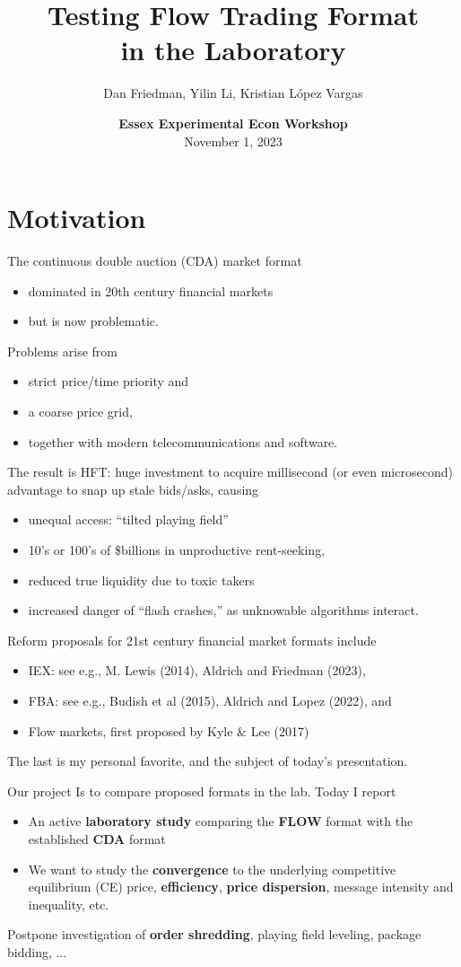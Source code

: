 \documentclass[10pt]{beamer}
\title[Flow Trading]{Testing Flow Trading Format \\in the Laboratory}
\author[YL]{Dan Friedman, Yilin Li, Kristian L\'opez Vargas}
\institute[Essex, UCSC]{University of Essex and 
University of California, Santa Cruz}
\date[Nov1 2023]{\textbf{Essex Experimental Econ Workshop} \\
November 1, 2023}
\begin{document}
\maketitle
\section{Motivation}
\begin{frame}{
The continuous double auction (CDA) market format}
\begin{itemize}
\item dominated in 20th century financial markets 
\item but is now problematic.  \pause
\end{itemize}
Problems arise from
\begin{itemize}
\item strict price/time priority and 
\item a coarse price grid, 
\item together with modern telecommunications and software.
\end{itemize} \pause
The result is HFT: huge investment to acquire millisecond (or even microsecond) advantage to snap up stale bids/asks, causing
\pause
\begin{itemize}
\item unequal access: ``tilted playing field''
\item 10's or 100's of \$billions in unproductive rent-seeking,
\item reduced true liquidity due to toxic takers
\item increased danger of ``flash crashes,'' as unknowable algorithms interact.
   \end{itemize}
\end{frame}

\begin{frame}{Reform proposals}
for 21st century financial market formats include
    \begin{itemize}
\item IEX: see e.g., M. Lewis (2014), Aldrich and Friedman (2023),
\item FBA: see e.g., Budish et al (2015), Aldrich and Lopez (2022), and
\item Flow markets, first proposed by  Kyle \& Lee (2017)
\end{itemize}
The last is my personal favorite, and the subject of today's presentation.
\end{frame}

\begin{frame}{Our project}
Is to compare proposed formats in the lab. Today I report
\begin{itemize}
 \item An active \textbf{laboratory study} comparing the \textbf{FLOW} format with the established \textbf{CDA} format
\item We want to study the \textbf{convergence} to the underlying competitive equilibrium (CE) price, \textbf{efficiency}, \textbf{price dispersion}, message intensity and inequality, etc. 
\end{itemize} 
Postpone investigation of \textbf{order shredding}, playing field leveling, package bidding, ...
\end{frame}
\end{document}

